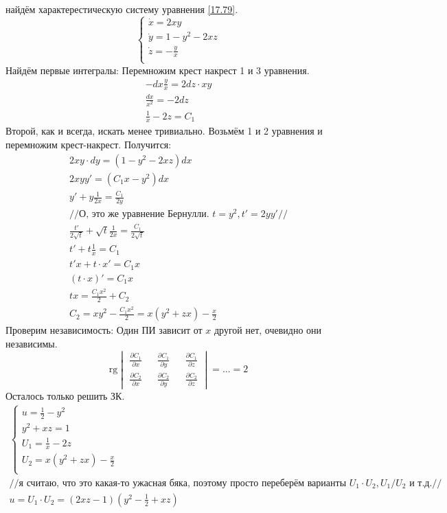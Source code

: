 \documentclass{article}
\newcommand{\rg}{\text{rg}}
\begin{document}
найдём характерестическую систему уравнения \ref{17.79}.
\begin{equation*}
    \begin{cases}
        \dot x = 2xy\\
        \dot y = 1-y^{2}-2 x z\\
        \dot z = -\frac{y}{x} \\
    \end{cases}
\end{equation*}
Найдём первые интегралы:
Перемножим крест накрест 1 и 3 уравнения. 
\begin{gather*}
    -dx \frac{y}{x}=2dz \cdot xy\\
    \frac{dx}{x^2}=-2 dz\\
    \frac{1}{x} - 2z = C_1
\end{gather*}
Второй, как и всегда, искать менее тривиально.
Возьмём 1 и 2 уравнения и перемножим крест-накрест. Получится:
\begin{gather*}
    2xy \cdot dy = (1-y^2-2xz) dx\\
    2xy y'=(C_1x-y^2)dx\\
    y'+y \frac{1}{2x}= \frac{C_1}{2y}\\
    //\text{О, это же уравнение Бернулли. } t=y^2,t'=2y y'  //\\
    \frac{t'}{2 \sqrt t}+\sqrt t \frac{1}{2x} = \frac{C_1}{2 \sqrt t}\\
    t'+t \frac{1}{x}= C_1\\
    t'x+t \cdot x' = C_1 x\\
    (t\cdot x)'=C_1x\\
    t x = \frac{C_1 x^2}{2} + C_2\\
    C_2 = xy^2- \frac{C_1 x^2}{2}= x(y^2+zx)-\frac{x}{2}
\end{gather*}
Проверим независимость: Один ПИ зависит от $x$ другой нет, очевидно они независимы.
\begin{equation*}
    \rg \begin{vmatrix}
        \frac{\partial C_1}{\partial x} && \frac{\partial C_1}{\partial y} && \frac{\partial C_1}{\partial z}\\
        \frac{\partial C_2}{\partial x} && \frac{\partial C_2}{\partial y} && \frac{\partial C_2}{\partial z}
    \end{vmatrix} = ... = 2
\end{equation*}
Осталось только решить ЗК.
\begin{gather*}
\begin{cases}
        u= \frac{1}{2} - y^2\\
        y^2+xz=1\\
        U_1=\frac{1}{x} - 2z\\
        U_2= x(y^2+zx)-\frac{x}{2}\\
    \end{cases} \\
    //\text{я считаю, что это какая-то ужасная бяка, поэтому просто переберём варианты } U_1 \cdot U_2, U_1/U_2 \text{ и т.д.}//\\
    u=U_1 \cdot U_2 = (2 x z-1)\left(y^{2}-\frac{1}{2}+x z\right)
\end{gather*}
\end{document}
